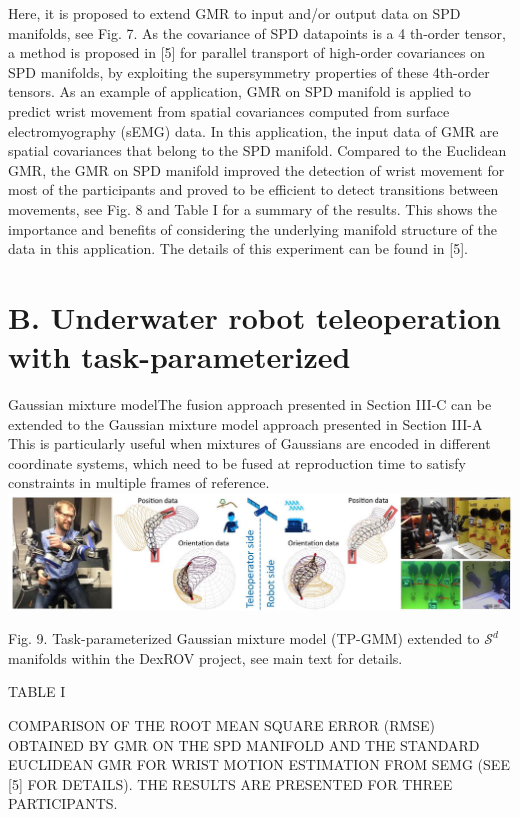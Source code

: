 \documentclass[10pt]{article}
\begin{document}
Here, it is proposed to extend GMR to input and/or output data on SPD manifolds, see Fig. 7. As the covariance of SPD datapoints is a 4 th-order tensor, a method is proposed in [5] for parallel transport of high-order covariances on SPD manifolds, by exploiting the supersymmetry properties of these 4th-order tensors. As an example of application, GMR on SPD manifold is applied to predict wrist movement from spatial covariances computed from surface electromyography (sEMG) data. In this application, the input data of GMR are spatial covariances that belong to the SPD manifold. Compared to the Euclidean GMR, the GMR on SPD manifold improved the detection of wrist movement for most of the participants and proved to be efficient to detect transitions between movements, see Fig. 8 and Table I for a summary of the results. This shows the importance and benefits of considering the underlying manifold structure of the data in this application. The details of this experiment can be found in [5].

\section{B. Underwater robot teleoperation with task-parameterized}
 Gaussian mixture modelThe fusion approach presented in Section III-C can be extended to the Gaussian mixture model approach presented in Section III-A This is particularly useful when mixtures of Gaussians are encoded in different coordinate systems, which need to be fused at reproduction time to satisfy constraints in multiple frames of reference.
\includegraphics[max width=\textwidth, center]{2023_01_25_b4240e152b7ba97a594cg-08}

Fig. 9. Task-parameterized Gaussian mixture model (TP-GMM) extended to $\mathcal{S}^{d}$ manifolds within the DexROV project, see main text for details.

TABLE I

COMPARISON OF THE ROOT MEAN SQUARE ERROR (RMSE) OBTAINED BY GMR ON THE SPD MANIFOLD AND THE STANDARD EUCLIDEAN GMR FOR WRIST MOTION ESTIMATION FROM SEMG (SEE [5] FOR DETAILS). THE RESULTS ARE PRESENTED FOR THREE PARTICIPANTS.
\end{document}
